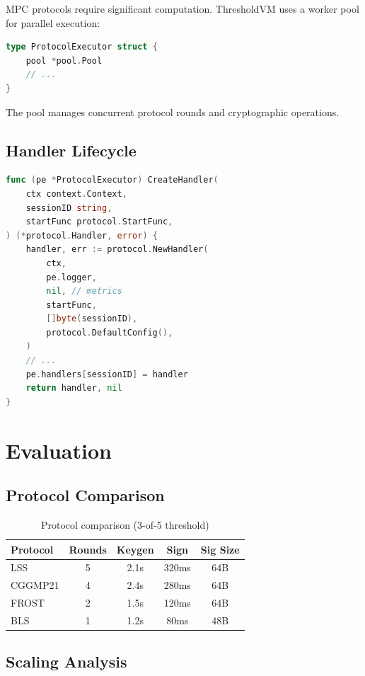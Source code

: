 \documentclass[11pt,twocolumn]{article}
\begin{document}
MPC protocols require significant computation. ThresholdVM uses a worker pool for parallel execution:

\begin{lstlisting}[language=Go,basicstyle=\ttfamily\small]
type ProtocolExecutor struct {
    pool *pool.Pool
    // ...
}
\end{lstlisting}

The pool manages concurrent protocol rounds and cryptographic operations.

\subsection{Handler Lifecycle}

\begin{lstlisting}[language=Go,basicstyle=\ttfamily\small]
func (pe *ProtocolExecutor) CreateHandler(
    ctx context.Context,
    sessionID string,
    startFunc protocol.StartFunc,
) (*protocol.Handler, error) {
    handler, err := protocol.NewHandler(
        ctx,
        pe.logger,
        nil, // metrics
        startFunc,
        []byte(sessionID),
        protocol.DefaultConfig(),
    )
    // ...
    pe.handlers[sessionID] = handler
    return handler, nil
}
\end{lstlisting}

\section{Evaluation}

\subsection{Protocol Comparison}

\begin{table}[h]
\centering
\begin{tabular}{|l|c|c|c|c|}
\hline
\textbf{Protocol} & \textbf{Rounds} & \textbf{Keygen} & \textbf{Sign} & \textbf{Sig Size} \\
\hline
LSS & 5 & 2.1s & 320ms & 64B \\
CGGMP21 & 4 & 2.4s & 280ms & 64B \\
FROST & 2 & 1.5s & 120ms & 64B \\
BLS & 1 & 1.2s & 80ms & 48B \\
\hline
\end{tabular}
\caption{Protocol comparison (3-of-5 threshold)}
\end{table}

\subsection{Scaling Analysis}
\end{document}
